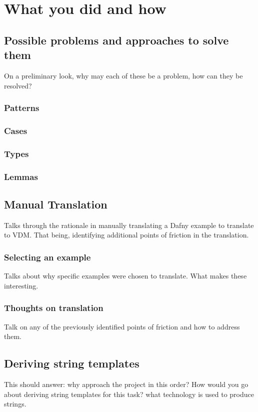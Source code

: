 \documentclass{entcs}
\begin{document}
\section{What you did and how}

\subsection{Possible problems and approaches to solve them}
On a preliminary look, why may each of these be a problem, how can they be resolved?

\subsubsection{Patterns}

\subsubsection{Cases}

\subsubsection{Types}


\subsubsection{Lemmas}

\subsection{Manual Translation}
Talks through the rationale in manually translating a Dafny example to translate to VDM. That being, identifying additional points of friction in the translation.

\subsubsection{Selecting an example}
Talks about why specific examples were chosen to translate. What makes these interesting.

\subsubsection{Thoughts on translation}
Talk on any of the previously identified points of friction and how to address them.

\subsection{Deriving string templates}
This should answer: why approach the project in this order? How would you go about deriving string templates for this task? what technology is used to produce strings.
\end{document}
